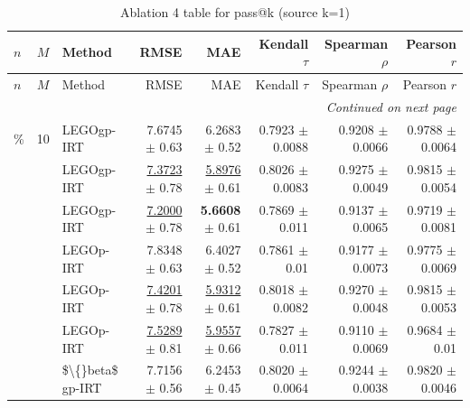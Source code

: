 \footnotesize
\setlength{\tabcolsep}{2pt}
\renewcommand{\arraystretch}{1.05}
\setlength{\LTpre}{0pt}
\setlength{\LTpost}{0pt}
\setlength{\LTleft}{\fill}
\setlength{\LTright}{\fill}
\begin{longtable}{llp{}rrrrr}
\caption{Ablation 4 table for pass@k (source k=1)}\label{tab:ablation\_4\_passk\_k1}\\
\toprule
$n$ & $M$ & Method & RMSE & MAE & Kendall $\tau$ & Spearman $\rho$ & Pearson $r$ \\
\midrule
\endfirsthead
\toprule
$n$ & $M$ & Method & RMSE & MAE & Kendall $\tau$ & Spearman $\rho$ & Pearson $r$ \\
\midrule
\endhead
\midrule
\multicolumn{8}{r}{\emph{Continued on next page}} \\
\midrule
\endfoot
\bottomrule
\endlastfoot
5\% & 10 & LEGOgp-IRT & 7.6745 {\scriptsize $\pm$ 0.63} & 6.2683 {\scriptsize $\pm$ 0.52} & 0.7923 {\scriptsize $\pm$ 0.0088} & 0.9208 {\scriptsize $\pm$ 0.0066} & 0.9788 {\scriptsize $\pm$ 0.0064} \\
 &  & LEGOgp-IRT & \underline{7.3723} {\scriptsize $\pm$ 0.78} & \underline{5.8976} {\scriptsize $\pm$ 0.61} & 0.8026 {\scriptsize $\pm$ 0.0083} & 0.9275 {\scriptsize $\pm$ 0.0049} & 0.9815 {\scriptsize $\pm$ 0.0054} \\
 &  & LEGOgp-IRT & \underline{7.2000} {\scriptsize $\pm$ 0.78} & \textbf{5.6608} {\scriptsize $\pm$ 0.61} & 0.7869 {\scriptsize $\pm$ 0.011} & 0.9137 {\scriptsize $\pm$ 0.0065} & 0.9719 {\scriptsize $\pm$ 0.0081} \\
 &  & LEGOp-IRT & 7.8348 {\scriptsize $\pm$ 0.63} & 6.4027 {\scriptsize $\pm$ 0.52} & 0.7861 {\scriptsize $\pm$ 0.01} & 0.9177 {\scriptsize $\pm$ 0.0073} & 0.9775 {\scriptsize $\pm$ 0.0069} \\
 &  & LEGOp-IRT & \underline{7.4201} {\scriptsize $\pm$ 0.78} & \underline{5.9312} {\scriptsize $\pm$ 0.61} & 0.8018 {\scriptsize $\pm$ 0.0082} & 0.9270 {\scriptsize $\pm$ 0.0048} & 0.9815 {\scriptsize $\pm$ 0.0053} \\
 &  & LEGOp-IRT & \underline{7.5289} {\scriptsize $\pm$ 0.81} & \underline{5.9557} {\scriptsize $\pm$ 0.66} & 0.7827 {\scriptsize $\pm$ 0.011} & 0.9110 {\scriptsize $\pm$ 0.0069} & 0.9684 {\scriptsize $\pm$ 0.01} \\
 &  & \$\textbackslash\{\}beta\$ gp-IRT & 7.7156 {\scriptsize $\pm$ 0.56} & 6.2453 {\scriptsize $\pm$ 0.45} & 0.8020 {\scriptsize $\pm$ 0.0064} & 0.9244 {\scriptsize $\pm$ 0.0038} & 0.9820 {\scriptsize $\pm$ 0.0046} \\

\end{longtable}
